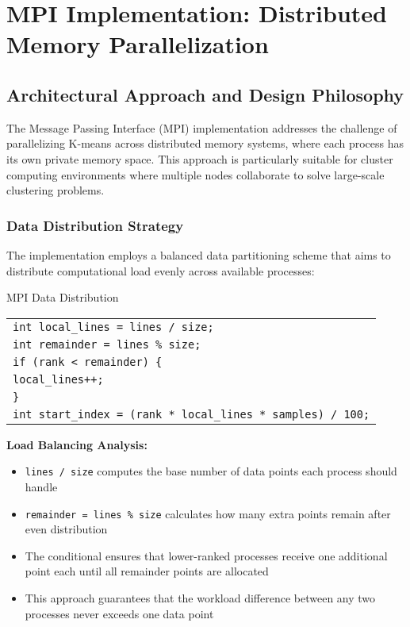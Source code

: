 \documentclass[12pt,a4paper]{article}
\makeatletter
\newcounter{alglineno}
\newenvironment{algtabular}{%
\setcounter{alglineno}{0}%
\begin{tabular}{@{\stepcounter{alglineno}\makebox[1.5em][r]{\tiny\thealglineno:}\hspace{0.3em}}l@{}}%
}{%
\end{tabular}%
}
\makeatother
\begin{document}
\section{MPI Implementation: Distributed Memory Parallelization}

\subsection{Architectural Approach and Design Philosophy}

The Message Passing Interface (MPI) implementation addresses the challenge of parallelizing K-means across distributed memory systems, where each process has its own private memory space. This approach is particularly suitable for cluster computing environments where multiple nodes collaborate to solve large-scale clustering problems.

\subsubsection{Data Distribution Strategy}

The implementation employs a balanced data partitioning scheme that aims to distribute computational load evenly across available processes:

\begin{algorithm}[H]
\caption{MPI Data Distribution}
\label{alg:mpi_distribution}
\begin{algtabular}
\texttt{int local\_lines = lines / size;} \\
\texttt{int remainder = lines \% size;} \\
\texttt{if (rank < remainder) \{} \\
\hspace{1cm}\texttt{local\_lines++;} \\
\texttt{\}} \\
\texttt{int start\_index = (rank * local\_lines * samples) / 100;} \\
\end{algtabular}
\end{algorithm}

\textbf{Load Balancing Analysis:}
\begin{itemize}
\item \texttt{lines / size} computes the base number of data points each process should handle
\item \texttt{remainder = lines \% size} calculates how many extra points remain after even distribution
\item The conditional ensures that lower-ranked processes receive one additional point each until all remainder points are allocated
\item This approach guarantees that the workload difference between any two processes never exceeds one data point
\end{itemize}
\end{document}
